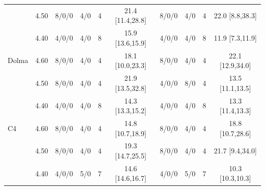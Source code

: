 \begin{table}[!t]
\begin{tabular*}{\textwidth}{@{\extracolsep{\fill}}lccccc@{\hspace{0.45em}}cccc@{}}
 & 4.50 & 8/0/0 & 4/0 & 4 & 21.4 [11.4,28.8] & 8/0/0 & 4/0 & 4 & 22.0 [8.8,38.3] \\
 & 4.40 & 4/0/0 & 4/0 & 8 & 15.9 [13.6,15.9] & 4/0/0 & 4/0 & 8 & 11.9 [7.3,11.9] \\
\addlinespace[2pt]
Dolma & 4.60 & 8/0/0 & 4/0 & 4 & 18.1 [10.0,23.3] & 8/0/0 & 4/0 & 4 & 22.1 [12.9,34.0] \\
 & 4.50 & 8/0/0 & 4/0 & 4 & 21.9 [13.5,32.8] & 4/0/0 & 8/0 & 4 & 13.5 [11.1,13.5] \\
 & 4.40 & 4/0/0 & 4/0 & 8 & 14.3 [13.3,15.2] & 4/0/0 & 4/0 & 8 & 13.3 [11.4,13.3] \\
\addlinespace[2pt]
C4 & 4.60 & 8/0/0 & 4/0 & 4 & 14.8 [10.7,18.9] & 8/0/0 & 4/0 & 4 & 18.8 [10.7,28.6] \\
 & 4.50 & 8/0/0 & 4/0 & 4 & 19.3 [14.7,25.5] & 8/0/0 & 4/0 & 4 & 21.7 [9.4,34.0] \\
 & 4.40 & 4/0/0 & 5/0 & 7 & 14.6 [14.6,16.7] & 4/0/0 & 5/0 & 7 & 10.3 [10.3,10.3] \\
\bottomrule
\end{tabular*}
\endgroup
\end{table}
